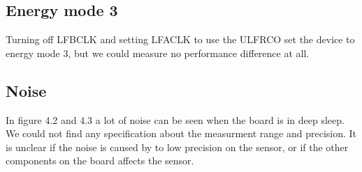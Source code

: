\subsection{Energy mode 3}
Turning off LFBCLK and setting LFACLK to use the ULFRCO set the device to energy mode 3, but we could measure no performance difference at all.

\subsection{}

\subsection{Noise}
In figure 4.2 and 4.3 a lot of noise can be seen when the board is in deep sleep. We could not find any specification about the measurment range and precision. It is unclear if the noise is caused by to low precision on the sensor, or if the other components on the board affects the sensor.